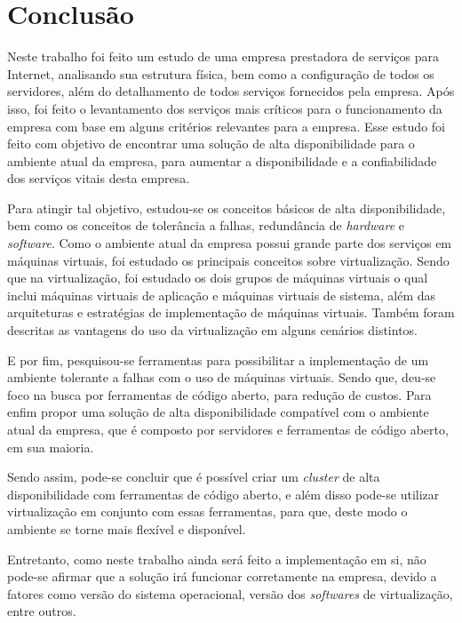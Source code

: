 \chapter{Conclusão}
\label{cap:conclusao}

Neste trabalho foi feito um estudo de uma empresa prestadora de serviços para Internet, analisando sua estrutura física, bem como a configuração
de todos os servidores, além do detalhamento de todos serviços fornecidos pela empresa. Após isso, foi feito o levantamento dos serviços mais 
críticos para o funcionamento da empresa com base em alguns critérios relevantes para a empresa. Esse estudo foi feito com objetivo de encontrar 
uma solução de alta disponibilidade para o ambiente atual da empresa, para aumentar a disponibilidade e a confiabilidade dos serviços vitais desta 
empresa.

Para atingir tal objetivo, estudou-se os conceitos básicos de alta disponibilidade, bem como os conceitos de tolerância a falhas, redundância de
\textit{hardware} e \textit{software}. Como o ambiente atual da empresa possui grande parte dos serviços em máquinas virtuais, foi estudado
os principais conceitos sobre virtualização. Sendo que na virtualização, foi estudado os dois grupos de máquinas virtuais o qual inclui máquinas 
virtuais de aplicação e máquinas virtuais de sistema, além das arquiteturas e estratégias de implementação de máquinas virtuais. Também foram 
descritas as vantagens do uso da virtualização em alguns cenários distintos.

E por fim, pesquisou-se ferramentas para possibilitar a implementação de um ambiente tolerante a falhas com o uso de máquinas virtuais.
Sendo que, deu-se foco na busca por ferramentas de código aberto, para redução de custos. Para enfim propor uma solução de alta disponibilidade 
compatível com o ambiente atual da empresa, que é composto por servidores e ferramentas de código aberto, em sua maioria.

Sendo assim, pode-se concluir que é possível criar um \textit{cluster} de alta disponibilidade com ferramentas de código aberto, e além disso 
pode-se utilizar virtualização em conjunto com essas ferramentas, para que, deste modo o ambiente se torne mais flexível e disponível. 

Entretanto, como neste trabalho ainda será feito a implementação em si, não pode-se afirmar que a solução irá funcionar corretamente
na empresa, devido a fatores como versão do sistema operacional, versão dos \textit{softwares} de virtualização, entre outros.

